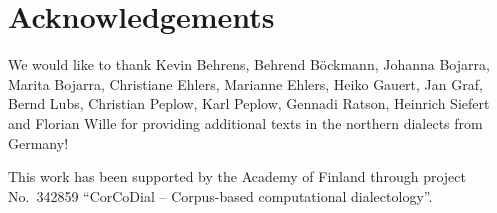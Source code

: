 \documentclass[output=paper,colorlinks,citecolor=brown]{langscibook}
\begin{document}
\section*{Acknowledgements}

\begin{sloppypar}
We would like to thank Kevin Behrens, Behrend Böckmann, Johanna Bojarra, Marita Bojarra, Christiane Ehlers, Marianne Ehlers, Heiko Gauert, Jan Graf, Bernd Lubs, Christian Peplow, Karl Peplow, Gennadi Ratson, Heinrich Siefert and Florian Wille for providing additional texts in the northern dialects from Germany! 
\end{sloppypar}

This work has been supported by the Academy of Finland through project No.~342859 ``CorCoDial -- Corpus-based computational dialectology''.

\printbibliography[heading=subbibliography,notkeyword=this]
\end{document}
